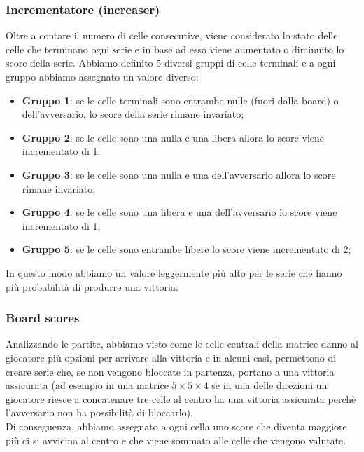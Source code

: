 \subsubsection{Incrementatore (increaser)}
Oltre a contare il numero di celle consecutive, viene considerato lo stato delle celle che terminano ogni serie e in base ad esso viene aumentato o diminuito lo score della serie.
Abbiamo definito 5 diversi gruppi di celle terminali e a ogni gruppo abbiamo assegnato un valore diverso:
\begin{itemize}
    \item \textbf{Gruppo 1}: se le celle terminali sono entrambe nulle (fuori dalla board) o dell'avversario, lo score della serie rimane invariato;
    \item \textbf{Gruppo 2}: se le celle sono una nulla e una libera allora lo score viene incrementato di 1;
    \item \textbf{Gruppo 3}: se le celle sono una nulla e una dell'avversario allora lo score rimane invariato;
    \item \textbf{Gruppo 4}: se le celle sono una libera e una dell'avversario lo score viene incrementato di 1;
    \item \textbf{Gruppo 5}: se le celle sono entrambe libere lo score viene incrementato di 2;
\end{itemize}
In questo modo abbiamo un valore leggermente più alto per le serie che hanno più probabilità di produrre una vittoria.

\subsubsection{Board scores}
Analizzando le partite, abbiamo visto come le celle centrali della matrice danno al giocatore più opzioni per arrivare alla vittoria e in alcuni casi, permettono di creare serie che, se non vengono bloccate in partenza, portano a una vittoria assicurata (ad esempio in una matrice $ 5 \times 5 \times 4  $ se in una delle direzioni un giocatore riesce a concatenare tre celle al centro ha una vittoria assicurata perchè l'avversario non ha possibilità di bloccarlo).\\
Di conseguenza, abbiamo assegnato a ogni cella uno score che diventa maggiore più ci si avvicina al centro e che viene sommato alle celle che vengono valutate.

